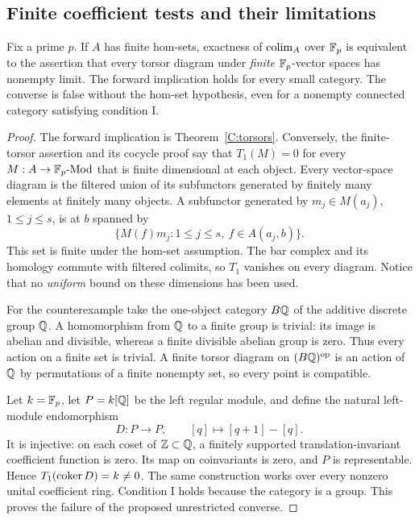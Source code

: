 \subsection{Finite coefficient tests and their limitations}

\begin{proposition}\label{C:finite-tests}
Fix a prime $p$. If $A$ has finite hom-sets, exactness of $\operatorname*{colim}_A$ over $\mathbb F_p$ is equivalent to the assertion that every torsor diagram under \emph{finite} $\mathbb F_p$-vector spaces has nonempty limit. The forward implication holds for every small category. The converse is false without the hom-set hypothesis, even for a nonempty connected category satisfying condition I.
\end{proposition}
\begin{proof}
The forward implication is Theorem~\ref{C:torsors}. Conversely, the finite-torsor assertion and its cocycle proof say that $T_1(M)=0$ for every $M:A\to\mathbb F_p\text{-}\mathrm{Mod}$ that is finite dimensional at each object. Every vector-space diagram is the filtered union of its subfunctors generated by finitely many elements at finitely many objects. A subfunctor generated by $m_j\in M(a_j)$, $1\leq j\leq s$, is at $b$ spanned by
\[
 \{M(f)m_j:1\leq j\leq s,\ f\in A(a_j,b)\}.
\]
This set is finite under the hom-set assumption. The bar complex and its homology commute with filtered colimits, so $T_1$ vanishes on every diagram. Notice that no \emph{uniform} bound on these dimensions has been used.

For the counterexample take the one-object category $B\mathbb Q$ of the additive discrete group $\mathbb Q$. A homomorphism from $\mathbb Q$ to a finite group is trivial: its image is abelian and divisible, whereas a finite divisible abelian group is zero. Thus every action on a finite set is trivial. A finite torsor diagram on $(B\mathbb Q)^{\mathrm{op}}$ is an action of $\mathbb Q$ by permutations of a finite nonempty set, so every point is compatible.

Let $k=\mathbb F_p$, let $P=k[\mathbb Q]$ be the left regular module, and define the natural left-module endomorphism
\[
 D:P\longrightarrow P,\qquad [q]\longmapsto[q+1]-[q].
\]
It is injective: on each coset of $\mathbb Z\subset\mathbb Q$, a finitely supported translation-invariant coefficient function is zero. Its map on coinvariants is zero, and $P$ is representable. Hence $T_1(\operatorname{coker} D)=k\ne0$. The same construction works over every nonzero unital coefficient ring. Condition I holds because the category is a group. This proves the failure of the proposed unrestricted converse.
\end{proof}

